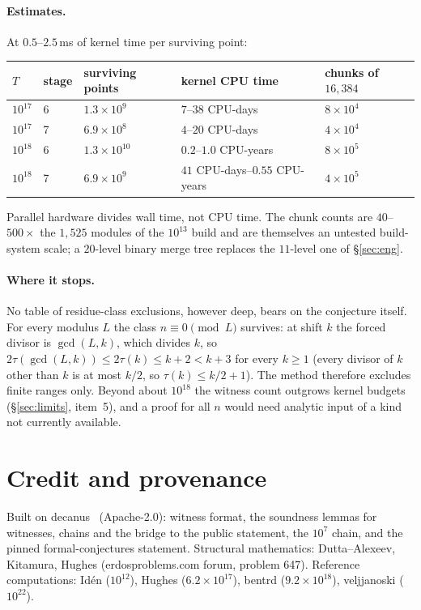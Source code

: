 \documentclass[11pt]{article}
\begin{document}
\paragraph{Estimates.} At $0.5$--$2.5$\,ms of kernel time per surviving point:
\begin{center}
\begin{tabular}{@{}lllll@{}}
\toprule
$T$ & stage & surviving points & kernel CPU time & chunks of $16{,}384$\\
\midrule
$10^{17}$ & 6 & $1.3\times10^{9}$ & $7$--$38$ CPU-days & $8\times10^{4}$\\
$10^{17}$ & 7 & $6.9\times10^{8}$ & $4$--$20$ CPU-days & $4\times10^{4}$\\
$10^{18}$ & 6 & $1.3\times10^{10}$ & $0.2$--$1.0$ CPU-years & $8\times10^{5}$\\
$10^{18}$ & 7 & $6.9\times10^{9}$ & $41$ CPU-days--$0.55$ CPU-years & $4\times10^{5}$\\
\bottomrule
\end{tabular}
\end{center}
Parallel hardware divides wall time, not CPU time. The chunk counts are $40$--$500\times$ the $1{,}525$ modules of the $10^{13}$ build and are themselves an untested build-system scale; a $20$-level binary merge tree replaces the $11$-level one of \S\ref{sec:eng}.

\paragraph{Where it stops.} No table of residue-class exclusions, however deep, bears on the conjecture itself. For every modulus $L$ the class $n\equiv0\pmod L$ survives: at shift $k$ the forced divisor is $\gcd(L,k)$, which divides $k$, so $2\tau(\gcd(L,k))\le2\tau(k)\le k+2<k+3$ for every $k\ge1$ (every divisor of $k$ other than $k$ is at most $k/2$, so $\tau(k)\le k/2+1$). The method therefore excludes finite ranges only. Beyond about $10^{18}$ the witness count outgrows kernel budgets (\S\ref{sec:limits}, item~5), and a proof for all $n$ would need analytic input of a kind not currently available.

\section*{Credit and provenance}

Built on decanus~\cite{decanus} (Apache-2.0): witness format, the soundness lemmas for witnesses, chains and the bridge to the public statement, the $10^{7}$ chain, and the pinned formal-conjectures statement. Structural mathematics: Dutta--Alexeev, Kitamura, Hughes (erdosproblems.com forum, problem 647). Reference computations: Id\'en ($10^{12}$), Hughes ($6.2\times10^{17}$), bentrd ($9.2\times10^{18}$), veljjanoski ($10^{22}$).
\end{document}
